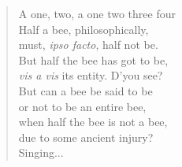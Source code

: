 \begin{verse}
A one, two, a one two three four \\

Half a bee, philosophically, \\
\vin must, \emph{ipso facto}, half not be. \\
But half the bee has got to be, \\
\vin \emph{vis a vis} its entity.  D'you see? \\

But can a bee be said to be \\
\vin or not to be an entire bee, \\
\vin when half the bee is not a bee, \\
\vin due to some ancient injury? \\

Singing... \\
\end{verse}
